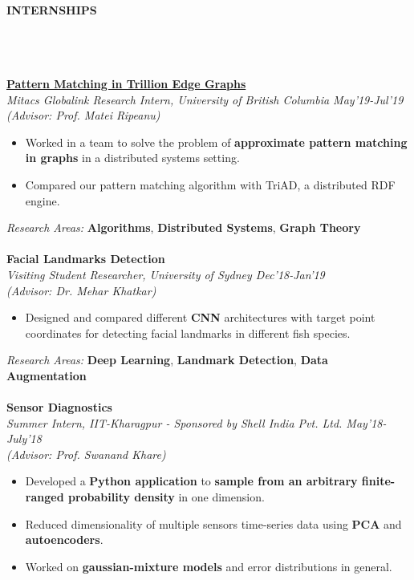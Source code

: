 \documentclass[a4,10pt]{book}
\newcommand{\lsep}{-0.57cm}
\newcommand{\psep}{-0.6cm}
\newcommand{\resheading}[1]{{\small \colorbox{mygrey}{\begin{minipage}{0.975\textwidth}{\textbf{#1 \vphantom{p\^{E}}}}\end{minipage}}}}
\begin{document}
\hfill 
\hspace{0.5cm}\\
\resheading{\textbf{INTERNSHIPS} }\\[\lsep]
\\\\
\large \href{http://netsyslab.ece.ubc.ca/wiki/index.php/People}{\textbf{Pattern Matching in Trillion Edge Graphs}} \normalsize \\
\emph{Mitacs Globalink Research Intern, University of British Columbia \hfill May'19-Jul'19 } \\ 
\emph{(Advisor: Prof. Matei Ripeanu)} \\[\lsep]
\begin{itemize}
\item Worked in a team to solve the problem of \textbf{approximate pattern matching in graphs} in a distributed systems setting.\\[\psep]
\item  Compared our pattern matching algorithm with TriAD, a distributed RDF engine.
\\[\lsep]
\end{itemize}
\emph{Research Areas:}  \textbf{Algorithms}, \textbf{Distributed Systems},
\textbf{Graph Theory}
\\\\
\large \textbf{Facial Landmarks Detection} \normalsize \\
\emph{Visiting Student Researcher, University of Sydney \hfill Dec'18-Jan'19} \\ 
\emph{(Advisor: Dr. Mehar Khatkar)} \\[\lsep]
\begin{itemize}
	\item  Designed and compared different \textbf{CNN} architectures with target point coordinates for detecting facial landmarks in different fish species.
	\\[\lsep]
\end{itemize}
\emph{Research Areas:}  \textbf{Deep Learning}, \textbf{Landmark Detection},
\textbf{Data Augmentation}
\\\\
\large \textbf{Sensor Diagnostics} \normalsize \\
\emph{Summer Intern, IIT-Kharagpur - Sponsored by Shell India Pvt. Ltd. \hfill May'18-July'18} \\ 
\emph{(Advisor: Prof. Swanand Khare)} \\[\lsep]
\begin{itemize}
\item  Developed a \textbf{Python application} to \textbf{sample from an arbitrary finite-ranged probability density} in one dimension.\\[\psep]
\item Reduced dimensionality of multiple sensors time-series data using \textbf{PCA} and \textbf{autoencoders}.\\[\psep]
\item Worked on \textbf{gaussian-mixture models} and error distributions in general.\\[\lsep]
\end{itemize}
\end{document}
